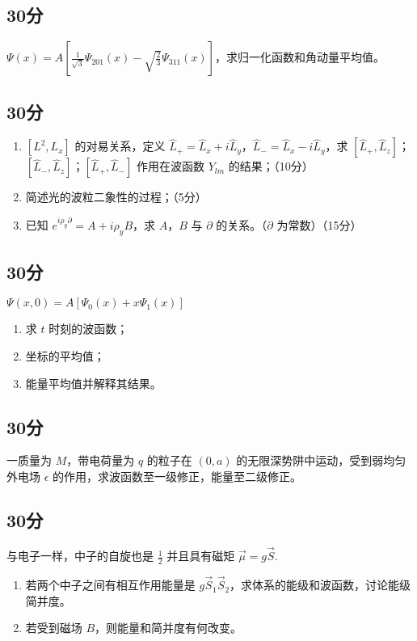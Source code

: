 
\subsection{30分}
$\displaystyle \varPsi (x)=A\left[\frac{1}{\sqrt{3}}\varPsi_{201}(x)-\sqrt{\frac{2}{3}}\varPsi_{311}(x)\right]$，求归一化函数和角动量平均值。
\subsection{30分}
\begin{enumerate}
\item $[L^{2},L_{x}]$ 的对易关系，定义 $\hat{L}_{+}=\hat{L}_{x}+i\hat{L}_{y}$，$\hat{L}_{-}=\hat{L}_{x}-i\hat{L}_{y}$，求 $[\hat{L}_{+},\hat{L}_{z}]$；$[\hat{L}_{-},\hat{L}_{z}]$；$[\hat{L}_{+},\hat{L}_{-}]$ 作用在波函数 $Y_{lm}$ 的结果；（10分）
\item 简述光的波粒二象性的过程；（5分）
\item 已知 $e^{i\rho_{y}\partial}=A+i\rho_{y}B$，求 $A$，$B$ 与 $\partial$ 的关系。（$\partial$ 为常数）（15分）
\end{enumerate}
\subsection{30分}
$\varPsi (x,0)=A[\varPsi_{0}(x)+x\varPsi_{1}(x)]$
\begin{enumerate}
\item 求 $t$ 时刻的波函数；
\item 坐标的平均值；
\item 能量平均值并解释其结果。
\end{enumerate}
\subsection{30分}
一质量为 $M$，带电荷量为 $q$ 的粒子在 $(0,a)$ 的无限深势阱中运动，受到弱均匀外电场 $\epsilon$ 的作用，求波函数至一级修正，能量至二级修正。
\subsection{30分}
与电子一样，中子的自旋也是 $\frac{1}{2}$ 并且具有磁矩 $\vec{\mu}=g\vec{S}$.
\begin{enumerate}
\item 若两个中子之间有相互作用能量是 $g\vec{S}_{1}\vec{S}_{2}$，求体系的能级和波函数，讨论能级简并度。
\item 若受到磁场 $B$，则能量和简并度有何改变。
\end{enumerate}
